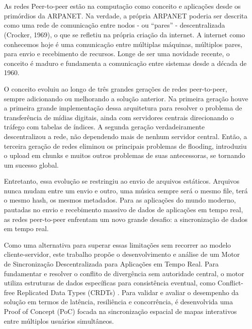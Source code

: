 

\chapter{}

As redes Peer-to-peer estão na computação como conceito e aplicações desde os
primórdios da ARPANET. Na verdade, a própria ARPANET poderia ser descrita como uma
rede de comunicação entre nodos - ou “pares” - descentralizada (Crocker, 1969), o
que se refletiu na própria criação da internet. A internet como conhecemos hoje é
uma comunicação entre múltiplas máquinas, múltiplos pares, para envio e recebimento
de recursos. Longe de ser uma novidade recente, o conceito é maduro e fundamenta a
comunicação entre sistemas desde a década de 1960.

O conceito evoluiu ao longo de três grandes gerações de redes peer-to-peer, sempre
adicionando ou melhorando a solução anterior. Na primeira geração houve a primeira
grande implementação dessa arquitetura para resolver o problema de transferência de
mídias digitais, ainda com servidores centrais direcionando o tráfego com tabelas de
índices. A segunda geração verdadeiramente descentralizou a rede, não dependendo mais
de nenhum servidor central. Então, a terceira geração de redes eliminou os principais
problemas de flooding, introduziu o upload em chunks e muitos outros problemas de suas
antecessoras, se tornando um sucesso global.

Entretanto, essa evolução se restringiu ao envio de arquivos estáticos. Arquivos nunca
mudam entre um envio e outro, uma música sempre será o mesmo file, terá o mesmo hash, os
mesmos metadados. Para as aplicações do mundo moderno, pautadas no envio e
recebimento massivo de dados de aplicações em tempo real, as redes peer-to-peer
enfrentam um novo grande desafio: a sincronização de dados em tempo real.

Como uma alternativa para superar essas limitações sem recorrer ao modelo
cliente-servidor, este trabalho propõe o desenvolvimento e análise de um
Motor de Sincronização Descentralizada para Aplicações em Tempo Real. Para
fundamentar e resolver o conflito de divergência sem autoridade central, o
motor utiliza estruturas de dados específicas para consistência eventual,
como Conflict-free Replicated Data Types (CRDTs) \cite{shapiro2011}. Para
validar e avaliar o desempenho da solução em termos de latência,
resiliência e concorrência, é desenvolvida uma Proof of Concept (PoC)
focada na sincronização espacial de mapas interativos entre múltiplos
usuários simultâneos.

